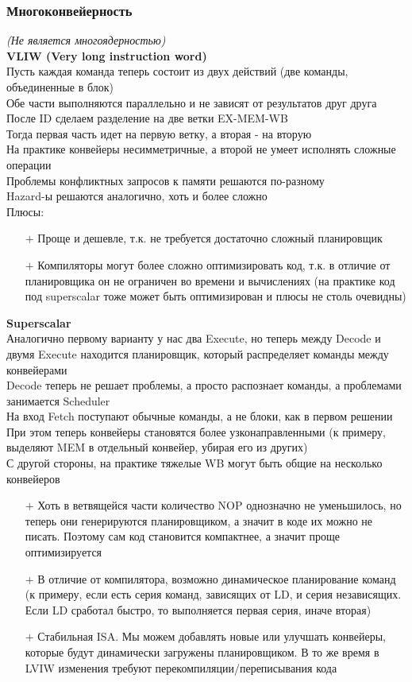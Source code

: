 \documentclass[12pt]{article}
\begin{document}
\subsubsection{Многоконвейерность}
\textit{(Не является многоядерностью)}\\
\textbf{VLIW (Very long instruction word)}\\
Пусть каждая команда теперь состоит из двух действий (две команды, объединенные в блок)\\
Обе части выполняются параллельно и не зависят от результатов друг друга\\
После ID сделаем разделение на две ветки EX-MEM-WB\\
Тогда первая часть идет на первую ветку, а вторая - на вторую\\
На практике конвейеры несимметричные, а второй не умеет исполнять сложные операции\\
Проблемы конфликтных запросов к памяти решаются по-разному\\
Hazard-ы решаются аналогично, хоть и более сложно\\
Плюсы:
\begin{enumerate}
    \item[$+$] Проще и дешевле, т.к. не требуется достаточно сложный планировщик
    \item[$+$] Компиляторы могут более сложно оптимизировать код, т.к. в отличие от планировщика он не ограничен во времени и вычислениях (на практике код под superscalar тоже может быть оптимизирован и плюсы не столь очевидны)
\end{enumerate}
\textbf{Superscalar}\\
Аналогично первому варианту у нас два Execute, но теперь между Decode и двумя Execute находится планировщик, который распределяет команды между конвейерами\\
Decode теперь не решает проблемы, а просто распознает команды, а проблемами занимается Scheduler\\
На вход Fetch поступают обычные команды, а не блоки, как в первом решении\\
При этом теперь конвейеры становятся более узконаправленными (к примеру, выделяют MEM в отдельный конвейер, убирая его из других)\\
С другой стороны, на практике тяжелые WB могут быть общие на несколько конвейеров
\begin{enumerate}
    \item[$+$] Хоть в ветвящейся части количество NOP однозначно не уменьшилось, но теперь они генерируются планировщиком, а значит в коде их можно не писать. Поэтому сам код становится компактнее, а значит проще оптимизируется
    \item[$+$] В отличие от компилятора, возможно динамическое планирование команд (к примеру, если есть серия команд, зависящих от LD, и серия независящих. Если LD сработал быстро, то выполняется первая серия, иначе вторая)
    \item[$+$] Стабильная ISA. Мы можем добавлять новые или улучшать конвейеры, которые будут динамически загружены планировщиком. В то же время в LVIW изменения требуют перекомпиляции/переписывания кода
\end{enumerate}
\end{document}
